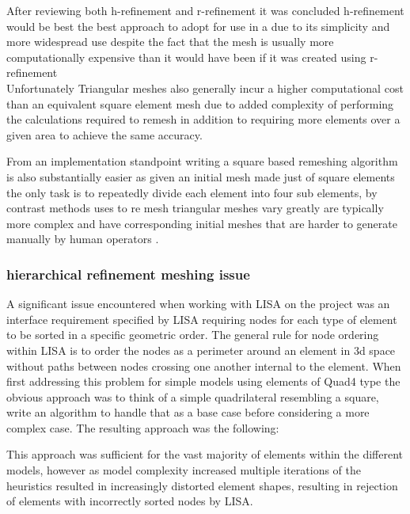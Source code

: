 \documentclass{article}
\begin{document}

After reviewing both h-refinement \cite{HandPRefinements} and r-refinement \cite{RRefinement} it was concluded h-refinement would be best the best approach to adopt for use in a due to its simplicity and more widespread use \cite{HandPRefinements} despite the fact that the mesh is usually more computationally expensive than it would have been if it was created using r-refinement \cite{RRefinement}\\ 

Unfortunately Triangular meshes also generally incur a higher computational cost than an equivalent square element mesh due to added complexity of performing the calculations required to remesh in addition to requiring more elements over a given area to achieve the same accuracy.

From an implementation standpoint writing a square based remeshing algorithm is also substantially easier as given an initial mesh made just of square elements the only task is to repeatedly divide each element into four sub elements, by contrast methods uses to re mesh triangular meshes vary greatly are typically more complex and have corresponding initial meshes that are harder to generate manually by human operators \cite{HandMeshing}.


\subsubsection{hierarchical refinement meshing issue}
A significant issue encountered when working with LISA on the project was an interface requirement specified by LISA requiring nodes for each type of element to be sorted in a specific geometric order. The general rule for node ordering within LISA is to order the nodes as a perimeter around an element in 3d space without paths between nodes crossing one another internal to the element. When first addressing this problem for simple models using elements of Quad4 type the obvious approach was to think of a simple quadrilateral resembling a square, write an algorithm to handle that as a base case before considering a more complex case. The resulting approach was the following:

\noindent
This approach was sufficient for the vast majority of elements within the different models, however as model complexity increased multiple iterations of the heuristics resulted in increasingly distorted element shapes, resulting in rejection of elements with incorrectly sorted nodes by LISA. \\
 
\end{document}
